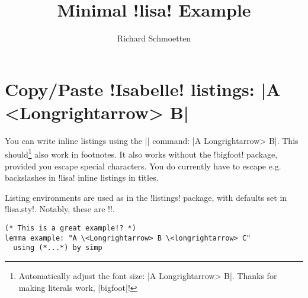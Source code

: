 \documentclass[]{article}
\title{Minimal \lisa!lisa! Example}
\author{Richard Schmoetten}
\begin{document}
\maketitle

\section{Copy/Paste \lisa!Isabelle! listings: \lisa|A \\<Longrightarrow> B|}

You can write inline listings using the \lisa|\lisa| command: \lisa|A \<Longrightarrow> B|. This should\footnote{Automatically adjust the font size: \lisa|A \<Longrightarrow> B|. Thanks for making literals work, \lisa|bigfoot|!} also work in footnotes. It also works without the \lisa!bigfoot! package, provided you escape special characters. You do currently have to escape e.g. backslashes in \lisa!lisa! inline listings in titles.

Listing environments are used as in the \lisa!listings! package, with defaults set in \lisa!lisa.sty!. Notably, these are \lisa!\footnotesize!.
\begin{lstlisting}
(* This is a great example!? *)
lemma example: "A \<Longrightarrow> B \<longrightarrow> C"
  using (*...*) by simp
\end{lstlisting}
\end{document}
